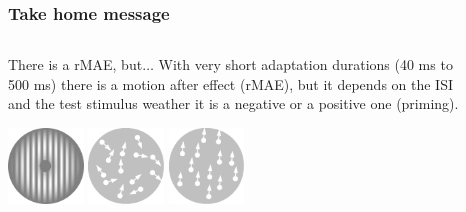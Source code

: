 \documentclass[xcolor={fixpdftex,hyperref,x11names},10pt,pdftex,hyperref={pdftex}]{beamer}
\begin{document}
\begin{frame}
    \frametitle{Take home message}
  \begin{columns}[t]
      \begin{column}{0.7\textwidth}
        \begin{block}{There is a rMAE, but$\dots$}
            With very short adaptation durations (40 ms to 500 ms) there is
            a motion after effect (rMAE), but it depends on the ISI and the
            test stimulus weather it is a negative or a positive one
            (priming).
        \end{block}

        \vspace{1cm}
        \begin{center}
       \includegraphics[width=2cm]{./figs/test_stim_ambiguous.png}
       \includegraphics[width=2cm]{./figs/test_stim_coherence.pdf}
       \includegraphics[width=2cm]{./figs/test_stim_upwards.pdf}
        \end{center}
      \end{column}
      \begin{column}{0.3\textwidth}
        \begin{figure}[h]
          \centering

\end{figure}
\end{column}
\end{columns}
\end{frame}
\end{document}
